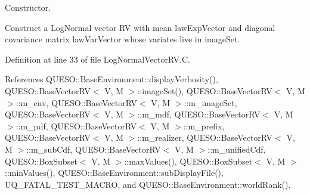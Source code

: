 Constructor. 

Construct a Log\-Normal vector R\-V with mean {\ttfamily law\-Exp\-Vector} and diagonal covariance matrix {\ttfamily law\-Var\-Vector} whose variates live in {\ttfamily image\-Set}. 

Definition at line 33 of file Log\-Normal\-Vector\-R\-V.\-C.



References Q\-U\-E\-S\-O\-::\-Base\-Environment\-::display\-Verbosity(), Q\-U\-E\-S\-O\-::\-Base\-Vector\-R\-V$<$ V, M $>$\-::image\-Set(), Q\-U\-E\-S\-O\-::\-Base\-Vector\-R\-V$<$ V, M $>$\-::m\-\_\-env, Q\-U\-E\-S\-O\-::\-Base\-Vector\-R\-V$<$ V, M $>$\-::m\-\_\-image\-Set, Q\-U\-E\-S\-O\-::\-Base\-Vector\-R\-V$<$ V, M $>$\-::m\-\_\-mdf, Q\-U\-E\-S\-O\-::\-Base\-Vector\-R\-V$<$ V, M $>$\-::m\-\_\-pdf, Q\-U\-E\-S\-O\-::\-Base\-Vector\-R\-V$<$ V, M $>$\-::m\-\_\-prefix, Q\-U\-E\-S\-O\-::\-Base\-Vector\-R\-V$<$ V, M $>$\-::m\-\_\-realizer, Q\-U\-E\-S\-O\-::\-Base\-Vector\-R\-V$<$ V, M $>$\-::m\-\_\-sub\-Cdf, Q\-U\-E\-S\-O\-::\-Base\-Vector\-R\-V$<$ V, M $>$\-::m\-\_\-unified\-Cdf, Q\-U\-E\-S\-O\-::\-Box\-Subset$<$ V, M $>$\-::max\-Values(), Q\-U\-E\-S\-O\-::\-Box\-Subset$<$ V, M $>$\-::min\-Values(), Q\-U\-E\-S\-O\-::\-Base\-Environment\-::sub\-Display\-File(), U\-Q\-\_\-\-F\-A\-T\-A\-L\-\_\-\-T\-E\-S\-T\-\_\-\-M\-A\-C\-R\-O, and Q\-U\-E\-S\-O\-::\-Base\-Environment\-::world\-Rank().


